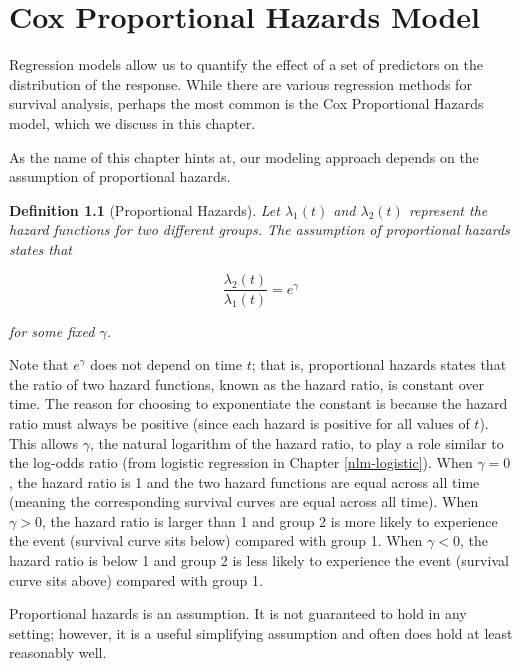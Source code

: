\documentclass[
]{book}
\theoremstyle{plain}
\theoremstyle{mydefn}
\newtheorem{definition}{Definition}[chapter]
\theoremstyle{myexmpl}
\theoremstyle{remark}
\begin{document}
\hypertarget{surv-cph}{%
\chapter{Cox Proportional Hazards Model}\label{surv-cph}}

Regression models allow us to quantify the effect of a set of predictors on the distribution of the response. While there are various regression methods for survival analysis, perhaps the most common is the Cox Proportional Hazards model, which we discuss in this chapter.

As the name of this chapter hints at, our modeling approach depends on the assumption of proportional hazards.

\begin{definition}[Proportional Hazards]
Let \(\lambda_1(t)\) and \(\lambda_2(t)\) represent the hazard functions for two different groups. The assumption of proportional hazards states that

\[\frac{\lambda_2(t)}{\lambda_1(t)} = e^{\gamma}\]

for some fixed \(\gamma\).
\end{definition}

Note that \(e^{\gamma}\) does not depend on time \(t\); that is, proportional hazards states that the ratio of two hazard functions, known as the hazard ratio, is constant over time. The reason for choosing to exponentiate the constant is because the hazard ratio must always be positive (since each hazard is positive for all values of \(t\)). This allows \(\gamma\), the natural logarithm of the hazard ratio, to play a role similar to the log-odds ratio (from logistic regression in Chapter \ref{nlm-logistic}). When \(\gamma = 0\), the hazard ratio is 1 and the two hazard functions are equal across all time (meaning the corresponding survival curves are equal across all time). When \(\gamma > 0\), the hazard ratio is larger than 1 and group 2 is more likely to experience the event (survival curve sits below) compared with group 1. When \(\gamma < 0\), the hazard ratio is below 1 and group 2 is less likely to experience the event (survival curve sits above) compared with group 1.

\begin{rmdwarning}
Proportional hazards is an assumption. It is not guaranteed to hold in any setting; however, it is a useful simplifying assumption and often does hold at least reasonably well.
\end{rmdwarning}
\end{document}
